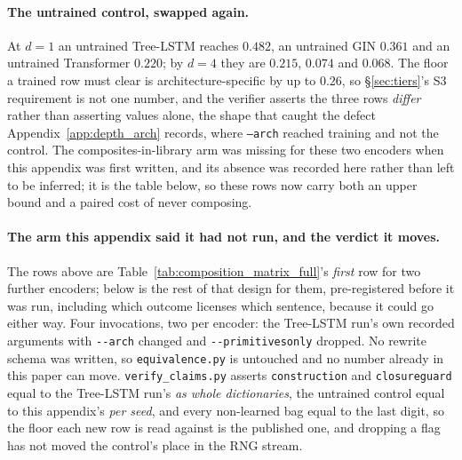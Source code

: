 \paragraph{The untrained control, swapped again.} At $d{=}1$ an untrained Tree-LSTM reaches $0.482$, an untrained GIN $0.361$ and an untrained Transformer $0.220$; by $d{=}4$ they are $0.215$, $0.074$ and $0.068$. The floor a trained row must clear is architecture-specific by up to $0.26$, so \S\ref{sec:tiers}'s S3 requirement is not one number, and the verifier asserts the three rows \emph{differ} rather than asserting values alone, the shape that caught the defect Appendix~\ref{app:depth_arch} records, where \texttt{--arch} reached training and not the control. The composites-in-library arm was missing for these two encoders when this appendix was first written, and its absence was recorded here rather than left to be inferred; it is the table below, so these rows now carry both an upper bound and a paired cost of never composing.

\paragraph{The arm this appendix said it had not run, and the verdict it moves.} The rows above are
Table~\ref{tab:composition_matrix_full}'s \emph{first} row for two further encoders; below is the rest of that
design for them, pre-registered before it was run, including which outcome licenses which sentence, because it
could go either way. Four invocations, two per encoder: the Tree-LSTM run's own recorded arguments with
\texttt{-{}-arch} changed and \texttt{-{}-primitives\ub only} dropped. No rewrite schema was written, so
\texttt{equivalence.py} is untouched and no number already in this paper can move.
\texttt{verify\_claims.py} asserts \texttt{construction} and \texttt{closure\ub guard} equal to the Tree-LSTM
run's \emph{as whole dictionaries}, the untrained control equal to this appendix's \emph{per seed}, and every
non-learned bag equal to the last digit, so the floor each new row is read against is the published one, and
dropping a flag has not moved the control's place in the RNG stream.

